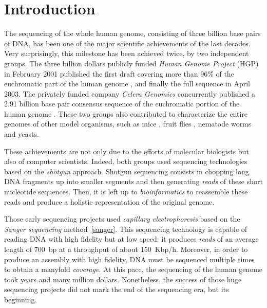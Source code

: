 \chapter{Introduction}

The sequencing of the whole human genome, consisting of three billion base pairs of DNA, has been one of the major scientific achievements of the last decades.
Very surprisingly, this milestone has been achieved twice, by two independent groups.
The three billion dollars publicly funded \emph{Human Genome Project} (HGP) in February 2001 published the first draft covering more than 96\~\% of the euchromatic part of the human genome \citep{hgp}, and finally the full sequence in April 2003.
The privately funded company \emph{Celera Genomics} concurrently published a 2.91 billion base pair consensus sequence of the euchromatic portion of the human genome \citep{celerahuman}.
These two groups also contributed to characterize the entire genomes of other model organisms, such as mice \citep{mouse}, fruit flies \citep{celerafly}, nematode worms and yeasts.

These achievements are not only due to the efforts of molecular biologists but also of computer scientists.
Indeed, both groups used sequencing technologies based on the \emph{shotgun} approach.
Shotgun sequencing consists in chopping long DNA fragments up into smaller segments and then generating \emph{reads} of these short nucleotide sequences.
Then, it is left up to \emph{bioinformatics} to reassemble these reads and produce a holistic representation of the original genome.


Those early sequencing projects used \emph{capillary electrophoresis} based on the \emph{Sanger sequencing} method~\ref{sanger}.
This sequencing technology is capable of reading DNA with high fidelity but at low speed: it produces \emph{reads} of an average length of 700~bp at a throughput of about 150~Kbp/h.
Moreover, in order to produce an assembly with high fidelity, DNA must be sequenced multiple times to obtain a manyfold \emph{coverage}.
At this pace, the sequencing of the human genome took years and many million dollars.
Nonetheless, the success of those huge sequencing projects did not mark the end of the sequencing era, but its beginning.

